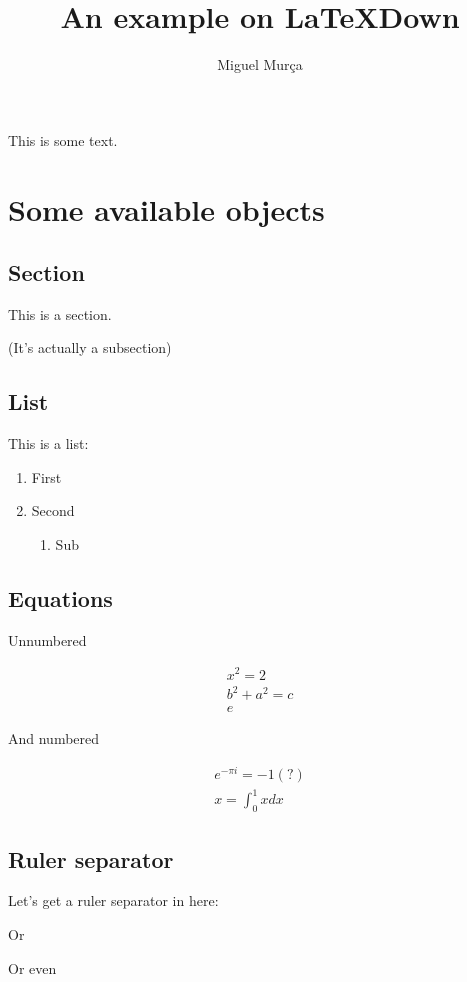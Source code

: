 \documentclass{article}
\title{An example on \LaTeX{}Down}
\author{Miguel Murça}
\date{}
\begin{document}
\maketitle

This is some text.

\section{Some available objects}

\subsection{Section}
This is a section.

(It's actually a subsection)

\subsection{List}

This is a list:

\begin{enumerate}
\item First
\item Second
\begin{enumerate}
\item Sub
\end{enumerate}
\end{enumerate}
\subsection{Equations}

Unnumbered

\begin{gather*}
x^2 = 2\\
b^2 + a^2 = c\\
e
\end{gather*}

And numbered

\begin{gather}
e^{-\pi i} = -1 (?)\\
x = \int_0^1 x dx
\end{gather}

\subsection{Ruler separator}

Let's get a ruler separator in here:

\noindent\makebox[\linewidth]{\rule{\textwidth}{0.4pt}}

Or

\noindent\makebox[\linewidth]{\rule{\textwidth}{0.4pt}}

Or even

\noindent\makebox[\linewidth]{\rule{\textwidth}{0.4pt}}
\end{document}
